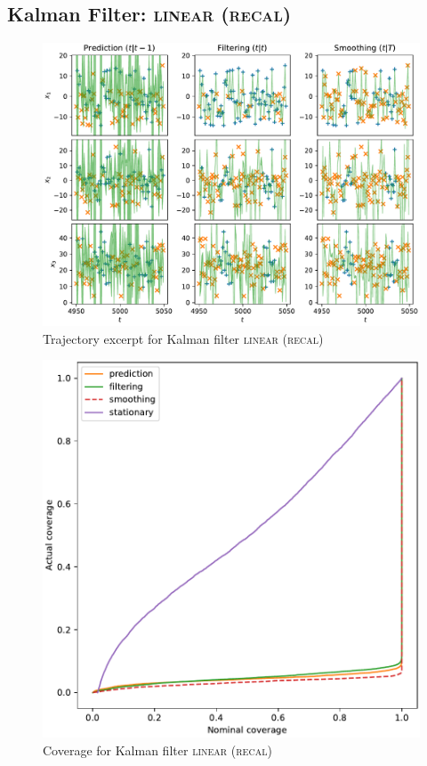 \subsection{Kalman Filter: {\textsc{linear (recal)}}}
\begin{figure}[H]
\begin{center}
\includegraphics[width=\linewidth]{generated/trajectory/Method.LINEAR-Recalibrate.YES.pdf}
\end{center}
\caption{Trajectory excerpt for Kalman filter \textsc{{\textsc{linear (recal)}}}}
\end{figure}
\begin{figure}[H]
\begin{center}
\includegraphics[width=\linewidth]{generated/coverage/Method.LINEAR-Recalibrate.YES.pdf}
\end{center}
\caption{Coverage for Kalman filter \textsc{{\textsc{linear (recal)}}}}
\end{figure}
